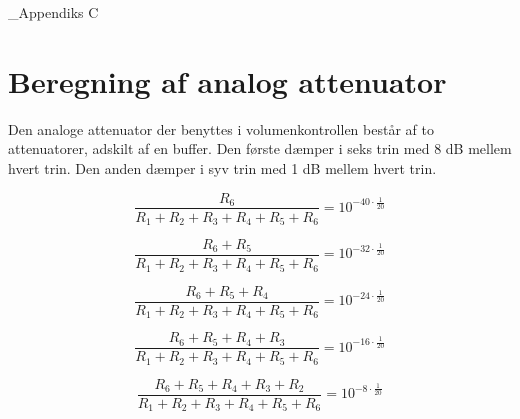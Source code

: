 \chapteR_{Appendiks C}
\label{beregning-af-analog-attenuator}
\section*{Beregning af analog attenuator}

Den analoge attenuator der benyttes i volumenkontrollen består af to attenuatorer, adskilt af en buffer. Den første dæmper i seks trin med 8 dB mellem hvert trin. Den anden dæmper i syv trin med 1 dB mellem hvert trin.

\begin{equation}
\frac{R_6}{R_1 + R_2 + R_3 + R_4 + R_5 + R_6} = 10^{-40 \cdot \frac{1}{20}}
\end{equation}

\begin{equation}
\frac{R_6 + R_5}{R_1 + R_2 + R_3 + R_4 + R_5 + R_6} = 10^{-32 \cdot \frac{1}{20}}
\end{equation}

\begin{equation}
\frac{R_6 + R_5 + R_4}{R_1 + R_2 + R_3 + R_4 + R_5 + R_6} = 10^{-24 \cdot \frac{1}{20}}
\end{equation}

\begin{equation}
\frac{R_6 + R_5 + R_4 + R_3}{R_1 + R_2 + R_3 + R_4 + R_5 + R_6} = 10^{-16 \cdot \frac{1}{20}}
\end{equation}

\begin{equation}
\frac{R_6 + R_5 + R_4 + R_3 + R_2}{R_1 + R_2 + R_3 + R_4 + R_5 + R_6} = 10^{-8 \cdot \frac{1}{20}}
\end{equation}
